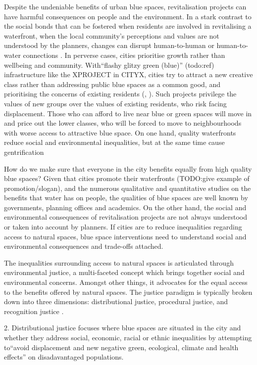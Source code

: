 \documentclass{article}
\begin{document}
Despite the undeniable benefits of urban blue spaces, revitalisation projects can have harmful consequences on people and the environment.
In a stark contrast to the social bonds that can be fostered when residents are involved in revitalising a waterfront, when the local community's perceptions and values are not understood by the planners, changes can disrupt human-to-human or human-to-water connections \parencite{toomey2021place}. In perverse cases, cities prioritise growth rather than wellbeing and community. With``flashy glitzy green (blue)'' (todo:ref) infrastructure like the XPROJECT in CITYX, cities try to attract a new creative class rather than addressing public blue spaces as a common good, and prioritising the concerns of existing residents (\cite{wessells2014urban}, \cite{anguelovski2020expanding}). 
Such projects privilege the values of new groups over the values of existing residents, who risk facing displacement. Those who can afford to live near blue or green spaces will move in and price out the lower classes, who will be forced to move to neighbourhoods with worse access to attractive blue space. On one hand, quality waterfronts reduce social and environmental inequalities, but at the same time cause gentrification \parencite{todo:REF OF GENTRIFICATION PAPER}

How do we make sure that everyone in the city benefits equally from high quality blue spaces? Given that cities promote their waterfronts (TODO:give example of promotion/slogan), and the numerous qualitative and quantitative studies on the benefits that water has on people, the qualities of blue spaces are well known by governments, planning offices and academics. On the other hand, the social and environmental consequences of revitalisation projects are not always understood or taken into account by planners. If cities are to reduce inequalities regarding access to natural spaces, blue space interventions need to understand social and environmental consequences and trade-offs attached.

The inequalities surrounding access to natural spaces is articulated through environmental justice, a multi-faceted concept which brings together social and environmental concerns. Amongst other things, it advocates for the equal access to the benefits offered by natural spaces. The justice paradigm is typically broken down into three dimensions: distributional justice, procedural justice, and recognition justice \parencite{todo:cite schlosberg}.

	2. Distributional justice focuses where blue spaces are situated in the city and whether they address social, economic, racial or ethnic inequalities by attempting to``avoid displacement and new negative green, ecological, climate and health effects'' \parencite{anguelovski2020expanding} on disadavantaged populations.
\end{document}
